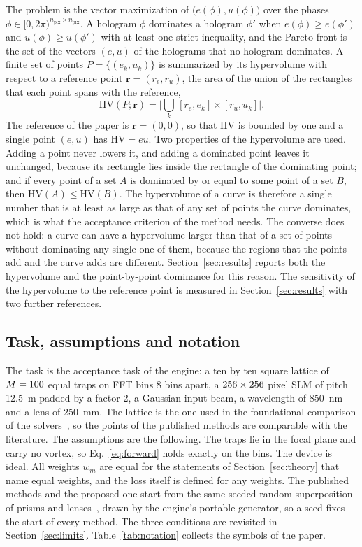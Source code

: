 The problem is the vector maximization of $\big(e(\phi),u(\phi)\big)$ over the phases $\phi\in[0,2\pi)^{n_{\mathrm{pix}}\times n_{\mathrm{pix}}}$. A hologram $\phi$ dominates a hologram $\phi'$ when $e(\phi)\ge e(\phi')$ and $u(\phi)\ge u(\phi')$ with at least one strict inequality,
and the Pareto front is the set of the vectors $(e,u)$ of the holograms that no hologram dominates. A finite set of points $P=\{(e_k,u_k)\}$ is summarized by its hypervolume with respect to a reference point $\mathbf r=(r_e,r_u)$, the area of the union of the rectangles that each point spans with the reference,
\begin{equation}
\mathrm{HV}(P;\mathbf r)=\Big|\bigcup_{k}\,[r_e,e_k]\times[r_u,u_k]\Big|.\label{eq:hv}
\end{equation}
The reference of the paper is $\mathbf r=(0,0)$, so that $\mathrm{HV}$ is bounded by one and a single point $(e,u)$ has $\mathrm{HV}=eu$. Two properties of the hypervolume are used. Adding a point never lowers it, and adding a dominated point leaves it unchanged, because its rectangle lies inside the rectangle of the dominating point; and if every
point of a set $A$ is dominated by or equal to some point of a set $B$, then $\mathrm{HV}(A)\le\mathrm{HV}(B)$. The hypervolume of a curve is therefore a single number that is at least as large as that of any set of points the curve dominates, which is what the acceptance criterion of the method needs. The converse does not hold: a curve can have a hypervolume
larger than that of a set of points without dominating any single one of them, because the regions that the points add and the curve adds are different. Section~\ref{sec:results} reports both the hypervolume and the point-by-point dominance for this reason.
The sensitivity of the hypervolume to the reference point is measured in Section~\ref{sec:results} with two further references.

\subsection{Task, assumptions and notation}

The task is the acceptance task of the engine: a ten by ten square lattice of $M=100$ equal traps on FFT bins 8 bins apart, a $256\times256$ pixel SLM of pitch 12.5~\textmu m padded by a factor 2, a Gaussian input beam, a wavelength of 850~nm and a lens of 250~mm. The lattice is the one used in the foundational
comparison of the solvers~\cite{dileonardo}, so the points of the published methods are comparable with the literature. The assumptions are the following. The traps lie in the focal plane and carry no vortex, so Eq.~\ref{eq:forward} holds exactly on the bins. The device is ideal. All weights $w_m$ are equal for the
statements of Section~\ref{sec:theory} that name equal weights, and the loss itself is defined for any weights. The published methods and the proposed one start from the same seeded random superposition of prisms and lenses~\cite{dileonardo}, drawn by the engine's portable generator, so a seed fixes the start of every method.
The three conditions are revisited in Section~\ref{sec:limits}. Table~\ref{tab:notation} collects the symbols of the paper.


